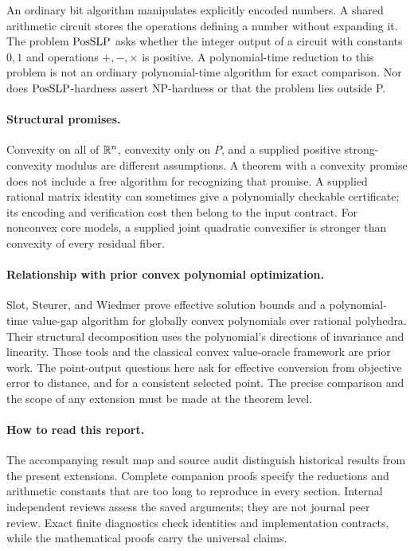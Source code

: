 An ordinary bit algorithm manipulates explicitly encoded numbers. A shared
arithmetic circuit stores the operations defining a number without expanding
it. The problem $\mathrm{PosSLP}$ asks whether the integer output of a circuit with
constants $0,1$ and operations $+,-,\times$ is positive. A polynomial-time
reduction to this problem is not an ordinary polynomial-time algorithm for
exact comparison. Nor does $\mathrm{PosSLP}$-hardness assert NP-hardness or that the
problem lies outside P.

\paragraph{Structural promises.}
Convexity on all of $\mathbb R^n$, convexity only on $P$, and a supplied positive
strong-convexity modulus are different assumptions. A theorem with a
convexity promise does not include a free algorithm for recognizing that
promise. A supplied rational matrix identity can sometimes give a
polynomially checkable certificate; its encoding and verification cost then
belong to the input contract. For nonconvex core models, a supplied joint
quadratic convexifier is stronger than convexity of every residual fiber.

\paragraph{Relationship with prior convex polynomial optimization.}
Slot, Steurer, and Wiedmer prove effective solution bounds and a
polynomial-time value-gap algorithm for globally convex polynomials over
rational polyhedra. Their structural decomposition uses the polynomial's
directions of invariance and linearity. Those tools and the classical convex
value-oracle framework are prior work. The point-output questions here ask
for effective conversion from objective error to distance, and for a
consistent selected point. The precise comparison and the scope of any
extension must be made at the theorem level.

\paragraph{How to read this report.}
The accompanying result map and source audit distinguish historical results
from the present extensions. Complete companion proofs specify the
reductions and arithmetic constants that are too long to reproduce in every
section. Internal independent reviews assess the saved arguments; they are
not journal peer review. Exact finite diagnostics check identities and
implementation contracts, while the mathematical proofs carry the universal
claims.
